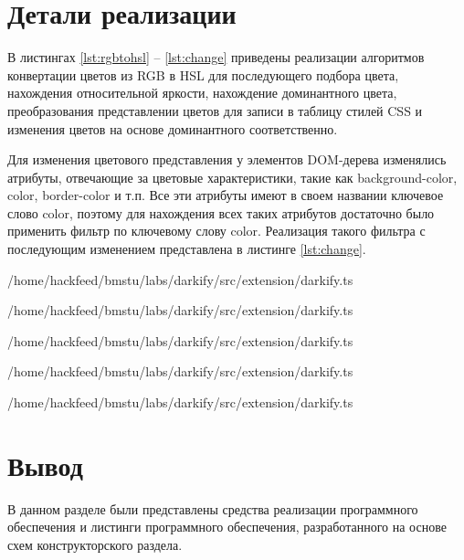 \section{Детали реализации}

В листингах \ref{lst:rgbtohsl} -- \ref{lst:change} приведены реализации алгоритмов конвертации цветов из RGB в HSL для последующего подбора цвета, нахождения относительной яркости, нахождение доминантного цвета, преобразования представлении цветов для записи в таблицу стилей CSS и изменения цветов на основе доминантного соответственно. 

Для изменения цветового представления у элементов DOM-дерева изменялись атрибуты, отвечающие за цветовые характеристики, такие как background-color, color, border-color и т.п. Все эти атрибуты имеют в своем названии ключевое слово color, поэтому для нахождения всех таких атрибутов достаточно было применить фильтр по ключевому слову color. Реализация такого фильтра с последующим изменением представлена в листинге \ref{lst:change}.

\begin{lstinputlisting}[
	caption={Реализация алгоритма конвертации цвета из RGB в HSL},
	label={lst:rgbtohsl},
	style={ES6},
	linerange={38-79},
	]{/home/hackfeed/bmstu/labs/darkify/src/extension/darkify.ts}
\end{lstinputlisting}

\begin{lstinputlisting}[
	caption={Реализация алгоритма нахождения относительной яркости},
	label={lst:luminance},
	style={ES6},
	linerange={80-91},
	]{/home/hackfeed/bmstu/labs/darkify/src/extension/darkify.ts}
\end{lstinputlisting}

\begin{lstinputlisting}[
	caption={Реализация алгоритма нахождения доминантного цвета},
	label={lst:domcolor},
	style={ES6},
	linerange={100-127},
	]{/home/hackfeed/bmstu/labs/darkify/src/extension/darkify.ts}
\end{lstinputlisting}

\begin{lstinputlisting}[
	caption={Реализация алгоритмов нахождения преобразования представлений цветов},
	label={lst:translate},
	style={ES6},
	linerange={16-37},
	]{/home/hackfeed/bmstu/labs/darkify/src/extension/darkify.ts}
\end{lstinputlisting}

\begin{lstinputlisting}[
	caption={Реализация алгоритма подбора цветов на основе базовго},
	label={lst:change},
	style={ES6},
	linerange={128-173},
	]{/home/hackfeed/bmstu/labs/darkify/src/extension/darkify.ts}
\end{lstinputlisting}

\section*{Вывод}

В данном разделе были представлены средства реализации программного обеспечения и листинги программного обеспечения, разработанного на основе схем конструкторского раздела.
